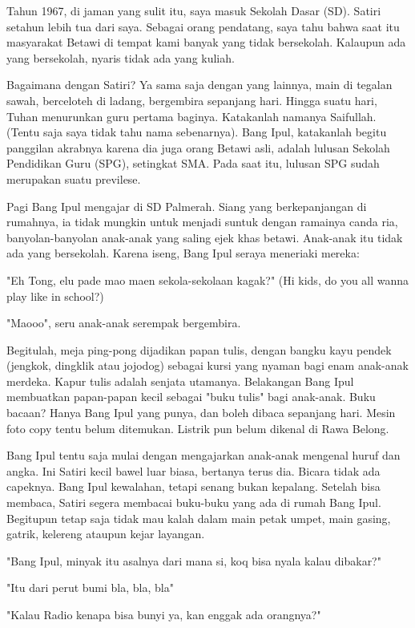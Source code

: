 Tahun 1967, di jaman yang sulit itu, saya masuk Sekolah Dasar (SD). Satiri setahun lebih tua dari saya. Sebagai orang pendatang, saya tahu bahwa saat itu masyarakat Betawi di tempat kami banyak yang tidak bersekolah. Kalaupun ada yang bersekolah, nyaris tidak ada yang kuliah.

Bagaimana dengan Satiri? Ya sama saja dengan yang lainnya, main di tegalan sawah, berceloteh di ladang, bergembira sepanjang hari. Hingga suatu hari, Tuhan menurunkan guru pertama baginya. Katakanlah namanya Saifullah. (Tentu saja saya tidak tahu nama sebenarnya). Bang Ipul, katakanlah begitu panggilan akrabnya karena dia juga orang Betawi asli, adalah lulusan Sekolah Pendidikan Guru (SPG), setingkat SMA. Pada saat itu, lulusan SPG sudah merupakan suatu previlese.

Pagi Bang Ipul mengajar di SD Palmerah. Siang yang berkepanjangan di rumahnya, ia tidak mungkin untuk menjadi suntuk dengan ramainya canda ria, banyolan-banyolan anak-anak yang saling ejek khas betawi. Anak-anak itu tidak ada yang bersekolah. Karena iseng, Bang Ipul seraya meneriaki mereka:

"Eh Tong, elu pade mao maen sekola-sekolaan kagak?" (Hi kids, do you all wanna play like in school?)

"Maooo", seru anak-anak serempak bergembira.

Begitulah, meja ping-pong dijadikan papan tulis, dengan bangku kayu pendek (jengkok, dingklik atau jojodog) sebagai kursi yang nyaman bagi enam anak-anak merdeka. Kapur tulis adalah senjata utamanya. Belakangan Bang Ipul membuatkan papan-papan kecil sebagai "buku tulis" bagi anak-anak. Buku bacaan? Hanya Bang Ipul yang punya, dan boleh dibaca sepanjang hari. Mesin foto copy tentu belum ditemukan. Listrik pun belum dikenal di Rawa Belong.

Bang Ipul tentu saja mulai dengan mengajarkan anak-anak mengenal huruf dan angka. Ini Satiri kecil bawel luar biasa, bertanya terus dia. Bicara tidak ada capeknya. Bang Ipul kewalahan, tetapi senang bukan kepalang. Setelah bisa membaca, Satiri segera membacai buku-buku yang ada di rumah Bang Ipul. Begitupun tetap saja tidak mau kalah dalam main petak umpet, main gasing, gatrik, kelereng ataupun kejar layangan.

"Bang Ipul, minyak itu asalnya dari mana si, koq bisa nyala kalau dibakar?"

"Itu dari perut bumi bla, bla, bla"

"Kalau Radio kenapa bisa bunyi ya, kan enggak ada orangnya?"

